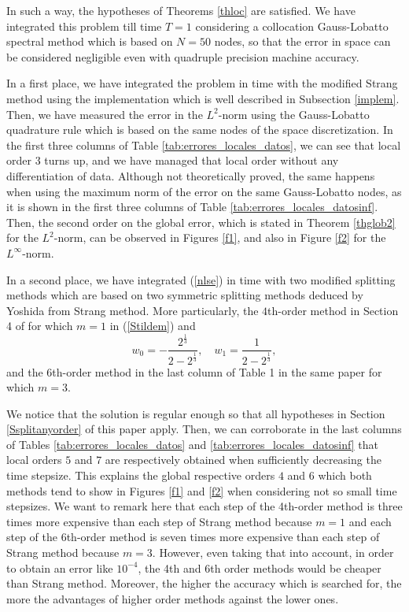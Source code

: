 \documentclass[a4paper,12pt]{article}
\begin{document}
In such a way, the hypotheses of Theorems \ref{thloc} are satisfied. We have integrated this problem till time $T=1$ considering a collocation Gauss-Lobatto spectral method \cite{BM,CHQZ} which is based on $N=50$ nodes, so that the error in space can be considered negligible even with quadruple precision machine accuracy.

In a first place, we have integrated the problem in time with the modified Strang method using the implementation which is well described in Subsection \ref{implem}. Then, we have measured the error in the $L^2$-norm using the Gauss-Lobatto quadrature rule which is based on the same nodes of the space discretization. In the first three columns of Table \ref{tab:errores_locales_datos}, we can see that local order $3$ turns up, and we have managed that local order without any differentiation of data. Although  not theoretically proved, the same happens when using the maximum norm of the error on the same Gauss-Lobatto nodes, as it is shown in the first three columns of Table \ref{tab:errores_locales_datosinf}. Then, the second order on the global error, which is stated in Theorem \ref{thglob2} for the $L^2$-norm, can be observed in Figures \ref{f1}, and also in Figure \ref{f2} for the $L^\infty$-norm.

In a second place, we have integrated (\ref{nlse}) in time with two modified splitting methods which are based on two symmetric splitting methods deduced by Yoshida from Strang method. More particularly, the $4$th-order method in Section 4 of \cite{Y} for which $m=1$ in  (\ref{Stildem}) and
$$
w_0=-\frac{2^{\frac{1}{3}}}{2-2^{\frac{1}{3}}}, \quad w_1=\frac{1}{2-2^{\frac{1}{3}}},$$
and the $6$th-order method in the last column of Table 1 in the same paper for which $m=3$.

We notice that the solution is regular enough so that all hypotheses in Section \ref{Ssplitanyorder} of this paper apply. Then, we can corroborate in the last columns of Tables \ref{tab:errores_locales_datos} and \ref{tab:errores_locales_datosinf} that local orders $5$ and $7$ are respectively obtained when sufficiently decreasing the time stepsize. This explains the global respective orders $4$ and $6$ which both methods tend to show in Figures \ref{f1} and \ref{f2} when considering not so small time stepsizes. We want to remark here that each step of the 4th-order method is three times more expensive than each step of Strang method because $m=1$ and each step of the 6th-order method is seven times more expensive than each step of Strang method because $m=3$. However, even taking that into account, in order to obtain an error like $10^{-4}$, the 4th and 6th order methods would be cheaper than Strang method. Moreover, the higher the accuracy which is searched for, the more the advantages of higher order methods against the lower ones.
\end{document}
